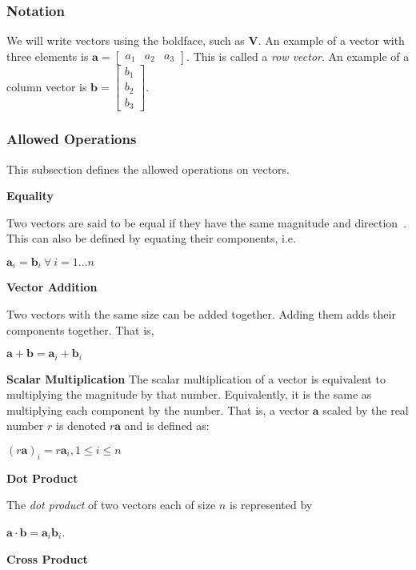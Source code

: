 \documentclass[12pt]{article}
\begin{document}
\subsubsection{Notation}
We will write vectors using the boldface, such as $\mathbf{V}$. An example of a vector with 
three elements is $\mathbf{a} = \begin{bmatrix}a_1 & a_2 & a_3 \end{bmatrix}$. This is
called a \textit{row vector}. An example of a column vector is $\mathbf{b} = 
\begin{bmatrix}b_1 \\ b_2 \\ b_3 \end{bmatrix}$.

\subsubsection{Allowed Operations} 

This subsection defines the allowed operations on vectors.

\noindent \textbf{Equality}

Two vectors are said to be equal if they have the same magnitude and 
direction~\citep{Wikipedia_EuclidVectors_2025}. This can also be defined by
equating their components, i.e. 

$\mathbf{a}_i = \mathbf{b}_i\ \forall~i = 1\ldots n$

\noindent\textbf{Vector Addition}

\noindent Two vectors with the same size can be added together. Adding them adds their
components together. That is,

$\mathbf{a} + \mathbf{b} = \mathbf{a}_i + \mathbf{b}_i$

\noindent\textbf{Scalar Multiplication}
The scalar multiplication of a vector is equivalent to multiplying the magnitude
by that number. Equivalently, it is the same as multiplying each component by the
number. That is, a vector $\mathbf{a}$ scaled by the real number $r$ is denoted
$r\mathbf{a}$ and is defined as:

$(r\mathbf{a})_i = r\mathbf{a}_i, 1 \leq i \leq n$

\noindent \textbf{Dot Product}

The \textit{dot product} of two vectors each of size $n$ is represented by

$\mathbf{a} \cdot \mathbf{b} = \mathbf{a}_i\mathbf{b}_i$.

\noindent \textbf{Cross Product}
\end{document}
